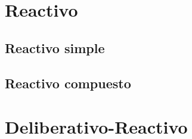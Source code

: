 \documentclass[11pt,a4paper]{article}
\begin{document}
\newpage

\section{Reactivo}

\subsection{Reactivo simple}

\subsection{Reactivo compuesto}



\newpage

\section{Deliberativo-Reactivo}
\end{document}

